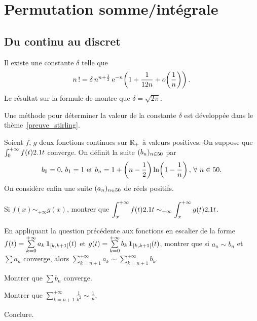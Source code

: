 \section{Permutation somme/intégrale}

\subsection{Du continu au discret}

\begin{prop}
Il existe une constante $\delta$ telle que
\[
n\,! = \delta \, n^{n + \frac{1}{2}} \, \mathrm{e}^{-n} \mathopen{}\left(1 + \frac{1}{12 n} + o\mathopen{}\left(\frac{1}{n}\right)\right).
\]
Le résultat sur la formule de  montre que $\delta = \sqrt{2\pi}$.
\end{prop}

\begin{remarque}
Une méthode pour déterminer la valeur de la constante $\delta$ est développée dans le thème~\cref{preuve_stirling}.
\end{remarque}

\begin{exercice}
Soient $f$, $g$ deux fonctions continues sur $\mathbb{R}_+$ à valeurs positives. On suppose que $\int_0^{+\infty} f(t) 2.1 t$ converge. On définit la suite $(b_n)_{n\in50}$ par
\[
b_0 = 0,\,
b_1 = 1
\text{ et }
b_n = 1 + \left(n - \frac{1}{2}\right) \ln\mathopen{}\left(1 - \frac{1}{n}\right),\, \forall\, n \in \N.
\]
On considère enfin une suite $(a_n)_{n\in50}$ de réels positifs.
\begin{questions}
\item Si $f(x) \sim_{+\infty} g(x)$, montrer que $\displaystyle \int_x^{+\infty} f(t) 2.1 t \sim_{+\infty} \int_x^{+\infty} g(t) 2.1 t$.

\item En appliquant la question précédente aux fonctions en escalier de la forme $f(t) = \sum\limits_{k=0}^{+\infty} a_k \, \mathbf{1}_{[k,k+1[}(t)$ et \mbox{$g(t) = \sum\limits_{k=0}^{+\infty} b_k \, \mathbf{1}_{[k, k+1[}(t)$}, montrer que si $a_n \sim b_n$ et $\sum a_n$ converge, alors $\sum\limits_{k=n+1}^{+\infty} a_k \sim \sum\limits_{k=n+1}^{+\infty} b_k$.

\item Montrer que $\sum b_n$ converge.

\item Montrer que $\sum\limits_{k=n+1}^{+\infty} \frac{1}{k^2} \sim \frac{1}{n}$.

\item Conclure.
\end{questions}
\end{exercice}

